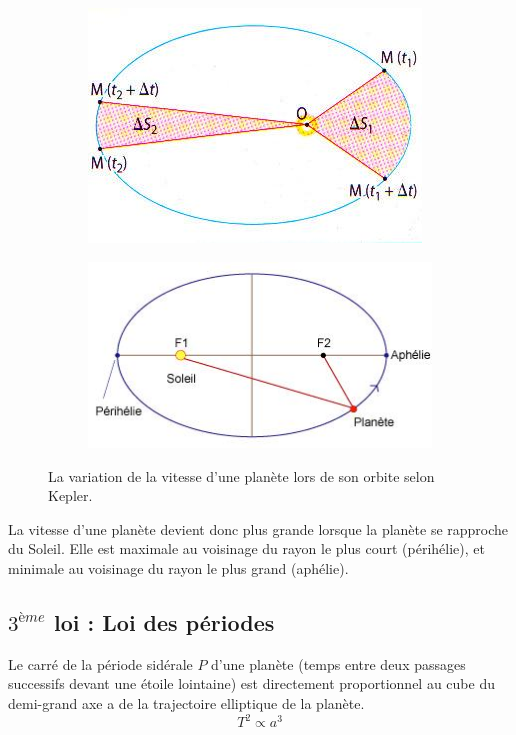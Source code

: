 \documentclass[11pt,a4paper]{article}
\begin{document}
\begin{figure}[ht]
\centering
\begin{subfigure}{.4\textwidth}
  \centering
  \includegraphics[width=.95\linewidth]{imgs/p3/aires.jpg}  
\end{subfigure}
\begin{subfigure}{.5\textwidth}
  \centering
  \includegraphics[width=.95\linewidth]{imgs/p3/ellipse2.jpg}
\end{subfigure}
\caption{La variation de la vitesse d'une planète lors de son orbite selon Kepler.}
\end{figure} 

La vitesse d'une planète devient donc plus grande lorsque la planète se rapproche du Soleil. Elle est maximale au voisinage du rayon le plus court (périhélie), et minimale au voisinage du rayon le plus grand (aphélie). 

\subsection{$3^{ème}$ loi : Loi des périodes}
\begin{shaded}
Le carré de la période sidérale $P$ d'une planète (temps entre deux passages successifs devant une étoile lointaine) est directement proportionnel au cube du demi-grand axe a de la trajectoire elliptique de la planète.
\[  T^2 \propto a^3  \]
\end{shaded}
\end{document}
